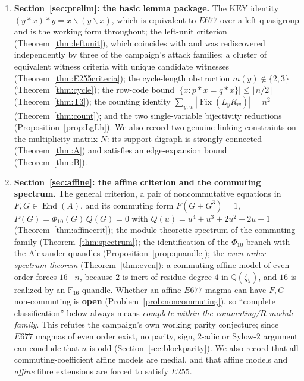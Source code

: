 \documentclass[11pt]{article}
\theoremstyle{plain}
\theoremstyle{definition}
\theoremstyle{remark}
\numberwithin{equation}{section}
\newcommand{\F}{\mathbb{F}}
\newcommand{\Q}{\mathbb{Q}}
\newcommand{\op}{\mathbin{*}}
\newcommand{\Fix}{\operatorname{Fix}}
\newcommand{\End}{\operatorname{End}}
\begin{document}
\begin{enumerate}
\item \textbf{Section~\ref{sec:prelim}: the basic lemma package.} The $\mathrm{KEY}$
identity $(y\op x)\op y = x\backslash(y\backslash x)$, which is equivalent to $E677$ over a
left quasigroup and is the working form throughout; the left-unit criterion
(Theorem~\ref{thm:leftunit}), which coincides with \cite[Lemma~13.1(ii)]{blueprint} and was
rediscovered independently by three of the campaign's attack families; a cluster of
equivalent witness criteria with unique candidate witnesses
(Theorem~\ref{thm:E255criteria}); the cycle-length obstruction $m(y)\notin\{2,3\}$
(Theorem~\ref{thm:cycle}); the row-code bound $|\{x: p\op x = q\op x\}| \le \lfloor
n/2\rfloor$ (Theorem~\ref{thm:T3}); the counting identity $\sum_{y,w}|\Fix(L_yR_w)| = n^2$
(Theorem~\ref{thm:count}); and the two single-variable bijectivity reductions
(Proposition~\ref{prop:LgLh}). We also record two genuine linking constraints on the
multiplicity matrix $N$: its support digraph is strongly connected (Theorem~\ref{thm:A}) and
satisfies an edge-expansion bound (Theorem~\ref{thm:B}).

\item \textbf{Section~\ref{sec:affine}: the affine criterion and the commuting spectrum.} The
general criterion, a pair of noncommutative equations in $F,G\in\End(A)$, and its commuting
form $F(G+G^3)=1$, $P(G) = \Phi_{10}(G)\,Q(G) = 0$ with
$Q(u) = u^4+u^3+2u^2+2u+1$ (Theorem~\ref{thm:affinecrit}); the module-theoretic spectrum of
the commuting family (Theorem~\ref{thm:spectrum}); the identification of the $\Phi_{10}$
branch with the Alexander
quandles (Proposition~\ref{prop:quandle}); the \emph{even-order spectrum theorem}
(Theorem~\ref{thm:even}): a commuting affine model of even order forces $16\mid n$, because
$2$ is inert of residue degree $4$ in $\Q(\zeta_5)$, and $16$ is realized by an $\F_{16}$
quandle. Whether an affine $E677$ magma can have $F,G$ non-commuting is
\textbf{open} (Problem~\ref{prob:noncommuting}), so ``complete classification'' below always
means \emph{complete within the commuting/$R$-module family}.
This refutes the campaign's own working parity conjecture; since $E677$ magmas of even order
exist, no parity, sign, $2$-adic or Sylow-$2$ argument can conclude that $n$ is odd
(Section~\ref{sec:blockparity}). We also record that all
commuting-coefficient affine models are medial, and that affine models and \emph{affine}
fibre extensions are forced to satisfy $E255$.


\end{enumerate}
\end{document}
